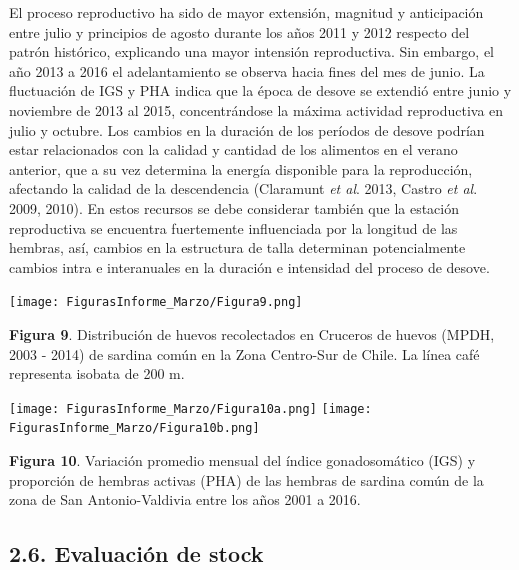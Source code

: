 \documentclass[
  spanish,
]{article}
\begin{document}
El proceso reproductivo ha sido de mayor extensión, magnitud y
anticipación entre julio y principios de agosto durante los años 2011 y
2012 respecto del patrón histórico, explicando una mayor intensión
reproductiva. Sin embargo, el año 2013 a 2016 el adelantamiento se
observa hacia fines del mes de junio. La fluctuación de IGS y PHA indica
que la época de desove se extendió entre junio y noviembre de 2013 al
2015, concentrándose la máxima actividad reproductiva en julio y
octubre. Los cambios en la duración de los períodos de desove podrían
estar relacionados con la calidad y cantidad de los alimentos en el
verano anterior, que a su vez determina la energía disponible para la
reproducción, afectando la calidad de la descendencia (Claramunt
\emph{et al}. 2013, Castro \emph{et al}. 2009, 2010). En estos recursos
se debe considerar también que la estación reproductiva se encuentra
fuertemente influenciada por la longitud de las hembras, así, cambios en
la estructura de talla determinan potencialmente cambios intra e
interanuales en la duración e intensidad del proceso de desove.

\begin{center}
\texttt{[image: FigurasInforme\_Marzo/Figura9.png]}
\end{center}

\small

\textbf{Figura 9}. Distribución de huevos recolectados en Cruceros de
huevos (MPDH, 2003 - 2014) de sardina común en la Zona Centro-Sur de
Chile. La línea café representa isobata de 200 m. \vspace{0.5cm}
\normalsize

\begin{center}
\texttt{[image: FigurasInforme\_Marzo/Figura10a.png]}
\texttt{[image: FigurasInforme\_Marzo/Figura10b.png]}
\end{center}

\small

\textbf{Figura 10}. Variación promedio mensual del índice gonadosomático
(IGS) y proporción de hembras activas (PHA) de las hembras de sardina
común de la zona de San Antonio-Valdivia entre los años 2001 a 2016.
\vspace{0.5cm} \normalsize

\hypertarget{evaluaciuxf3n-de-stock}{%
\subsection{2.6. Evaluación de stock}\label{evaluaciuxf3n-de-stock}}
\end{document}
